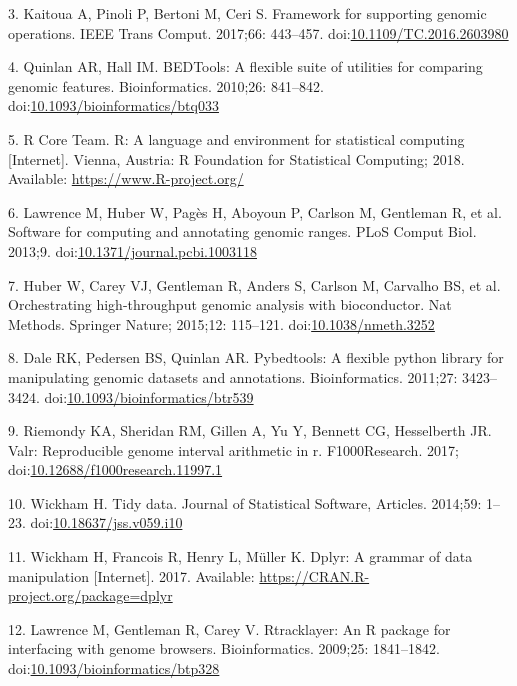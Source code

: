 \documentclass[10pt,letterpaper]{article}
\begin{document}
\hypertarget{ref-Kaitoua2017-pw}{}
3. Kaitoua A, Pinoli P, Bertoni M, Ceri S. Framework for supporting
genomic operations. IEEE Trans Comput. 2017;66: 443--457.
doi:\href{https://doi.org/10.1109/TC.2016.2603980}{10.1109/TC.2016.2603980}

\hypertarget{ref-Quinlan2010-gc}{}
4. Quinlan AR, Hall IM. BEDTools: A flexible suite of utilities for
comparing genomic features. Bioinformatics. 2010;26: 841--842.
doi:\href{https://doi.org/10.1093/bioinformatics/btq033}{10.1093/bioinformatics/btq033}

\hypertarget{ref-r-core}{}
5. R Core Team. R: A language and environment for statistical computing
{[}Internet{]}. Vienna, Austria: R Foundation for Statistical Computing;
2018. Available: \url{https://www.R-project.org/}

\hypertarget{ref-Lawrence2013-wg}{}
6. Lawrence M, Huber W, Pagès H, Aboyoun P, Carlson M, Gentleman R, et
al. Software for computing and annotating genomic ranges. PLoS Comput
Biol. 2013;9.
doi:\href{https://doi.org/10.1371/journal.pcbi.1003118}{10.1371/journal.pcbi.1003118}

\hypertarget{ref-Huber2015-ei}{}
7. Huber W, Carey VJ, Gentleman R, Anders S, Carlson M, Carvalho BS, et
al. Orchestrating high-throughput genomic analysis with bioconductor.
Nat Methods. Springer Nature; 2015;12: 115--121.
doi:\href{https://doi.org/10.1038/nmeth.3252}{10.1038/nmeth.3252}

\hypertarget{ref-Dale2011-js}{}
8. Dale RK, Pedersen BS, Quinlan AR. Pybedtools: A flexible python
library for manipulating genomic datasets and annotations.
Bioinformatics. 2011;27: 3423--3424.
doi:\href{https://doi.org/10.1093/bioinformatics/btr539}{10.1093/bioinformatics/btr539}

\hypertarget{ref-Kent2017}{}
9. Riemondy KA, Sheridan RM, Gillen A, Yu Y, Bennett CG, Hesselberth JR.
Valr: Reproducible genome interval arithmetic in r. F1000Research. 2017;
doi:\href{https://doi.org/10.12688/f1000research.11997.1}{10.12688/f1000research.11997.1}

\hypertarget{ref-Wickham2014-jc}{}
10. Wickham H. Tidy data. Journal of Statistical Software, Articles.
2014;59: 1--23.
doi:\href{https://doi.org/10.18637/jss.v059.i10}{10.18637/jss.v059.i10}

\hypertarget{ref-Wickham2017-dplyr}{}
11. Wickham H, Francois R, Henry L, Müller K. Dplyr: A grammar of data
manipulation {[}Internet{]}. 2017. Available:
\url{https://CRAN.R-project.org/package=dplyr}

\hypertarget{ref-Lawrence2009-nt}{}
12. Lawrence M, Gentleman R, Carey V. Rtracklayer: An R package for
interfacing with genome browsers. Bioinformatics. 2009;25: 1841--1842.
doi:\href{https://doi.org/10.1093/bioinformatics/btp328}{10.1093/bioinformatics/btp328}
\end{document}
